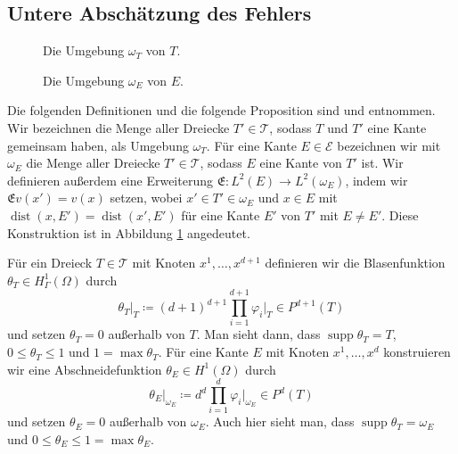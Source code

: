 \documentclass{scrartcl}
\newcommand{\cE}{\mathcal{E}}
\newcommand{\cT}{\mathcal{T}}
\newcommand{\erw}{\mathfrak{E}}			%
\DeclareMathOperator{\supp}{supp}			%
\DeclareMathOperator{\dist}{dist}			%
\begin{document}
\subsection{Untere Abschätzung des Fehlers}
%
\begin{figure}[h]%
\centering%
\begin{minipage}{0.47\textwidth}%
\centering%
%
\caption{Die Umgebung $\omega_T$ von $T$.}%
\end{minipage}%
\hfill%
\begin{minipage}{0.47\textwidth}%
\centering%
%
\caption{Die Umgebung $\omega_E$ von $E$.}%
\label{dr:OmegaE}%
\end{minipage}%
\end{figure}%
Die folgenden Definitionen und die folgende Proposition sind \cite[S.170f.]{Bra-2007} und \cite[S.83]{Ver-2013} entnommen.
Wir bezeichnen die Menge aller Dreiecke $T'\in\cT$, sodass $T$ und $T'$ eine Kante gemeinsam haben, als Umgebung $\omega_T$.\label{ch:DefinitionOmegaT}
Für eine Kante $E\in\cE$ bezeichnen wir mit $\omega_E$ die Menge aller Dreiecke $T'\in\cT$, sodass $E$ eine Kante von $T'$ ist. Wir definieren außerdem eine Erweiterung $\erw\colon L^2(E)\to L^2(\omega_E)$, indem wir $\erw v(x') = v(x)$ setzen, wobei $x'\in T'\in\omega_E$ und $x\in E$ mit $\dist(x,E')=\dist(x',E')$ für eine Kante $E'$ von $T'$ mit $E\neq E'$. Diese Konstruktion ist in Abbildung \ref{dr:OmegaE} angedeutet.

Für ein Dreieck $T\in\cT$ mit Knoten $x^1,\dots,x^{d+1}$  definieren wir die Blasenfunktion $\theta_T\in H^1_\Gamma(\Omega)$ durch
$$\theta_T\big\vert_T\coloneqq(d+1)^{d+1}\prod_{i=1}^{d+1}\varphi_i\big\vert_T\in P^{d+1}(T)$$
 und setzen $\theta_T=0$ außerhalb von $T$.
Man sieht dann, dass $\supp\theta_T=T$, $0\leq\theta_T\leq1$ und $1=\max\theta_T$. Für eine Kante $E$ mit Knoten $x^1,\dots,x^d$ konstruieren wir eine Abschneide\-funktion $\theta_E\in H^1(\Omega)$ durch
$$\theta_E\big\vert_{\omega_E}\coloneqq d^d\prod_{i=1}^d\varphi_i\big\vert_{\omega_E}\in P^d(T)$$
und setzen $\theta_E=0$ außerhalb von $\omega_E$. Auch hier sieht man, dass $\supp\theta_T=\omega_E$ und $0\leq\theta_E\leq1=\max\theta_E$.
\end{document}
